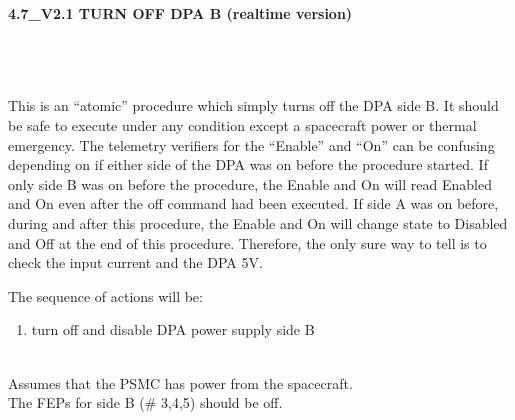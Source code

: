 \documentclass[11pt]{article}
\begin{document}
%
%
%
\newcommand{\be}{\begin{enumerate}}
\newcommand{\ee}{\end{enumerate}}
\newcommand{\bc}{\begin{center}}
\newcommand{\ec}{\end{center}}
\newcommand{\bi}{\begin{itemize}}
\newcommand{\ei}{\end{itemize}}
\newcommand{\bd}{\begin{description}}
\newcommand{\ed}{\end{description}}
\newcommand{\bt}{\begin{tabbing}}
\newcommand{\et}{\end{tabbing}}
\newcommand{\eg}{{\it e.g.~}}
\newcommand{\ie}{{\it i.e.~}}
\newcommand{\ul}{\underline}
\newcommand{\axaf}{{\em AXAF}}
\def\la{\hbox{\rlap{$<$}\lower0.5ex\hbox{$\sim$}\ }}


\large
\centerline {\bf 4.7\_V2.1 TURN OFF DPA B (realtime version) }
\vspace{0.25in}

\normalsize
{}\\
 \\


 \\
\normalsize
This is an ``atomic'' procedure which simply turns off the DPA side B.
It should be safe to execute under any
condition except a spacecraft power or thermal emergency.
The telemetry verifiers for the ``Enable'' and ``On''  can be
confusing depending on if either side of the DPA was on before the
procedure started.  If only side B was on before the procedure, the Enable and
On will read Enabled and On even after the off command had been
executed.  If side A was on before, during and after this procedure,
the Enable and On will change state to Disabled and Off at the end of
this procedure. Therefore, the only sure way to tell is to check the input
current and the DPA 5V.

\vspace{0.25in}
\noindent The sequence of actions will be:
\be
\item  turn off and disable DPA power supply side B
\ee


\vspace{0.15in}
\normalsize
{} \\
\normalsize
Assumes that the PSMC has power from the spacecraft. \\
The FEPs for side B (\# 3,4,5) should be off. \\
\end{document}
